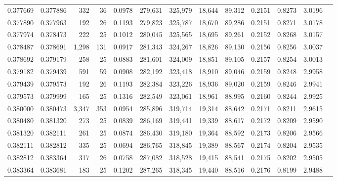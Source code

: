 \begin{tabular}{rrrrrrrrrrrrr}
0.377669 & 0.377886 &   332 &  36 &                                     0.0978 & 279,631 & 325,979 &  18,644 &  89,312 & 0.2151 & 0.8273 & 3.0196 \\
0.377890 & 0.377963 &   192 &  26 &                                     0.1193 & 279,823 & 325,787 &  18,670 &  89,286 & 0.2151 & 0.8271 & 3.0178 \\
0.377974 & 0.378473 &   222 &  25 &                                     0.1012 & 280,045 & 325,565 &  18,695 &  89,261 & 0.2152 & 0.8268 & 3.0157 \\
0.378487 & 0.378691 & 1,298 & 131 &                                     0.0917 & 281,343 & 324,267 &  18,826 &  89,130 & 0.2156 & 0.8256 & 3.0037 \\
0.378692 & 0.379179 &   258 &  25 &                                     0.0883 & 281,601 & 324,009 &  18,851 &  89,105 & 0.2157 & 0.8254 & 3.0013 \\
0.379182 & 0.379439 &   591 &  59 &                                     0.0908 & 282,192 & 323,418 &  18,910 &  89,046 & 0.2159 & 0.8248 & 2.9958 \\
0.379439 & 0.379573 &   192 &  26 &                                     0.1193 & 282,384 & 323,226 &  18,936 &  89,020 & 0.2159 & 0.8246 & 2.9941 \\
0.379573 & 0.379999 &   165 &  25 &                                     0.1316 & 282,549 & 323,061 &  18,961 &  88,995 & 0.2160 & 0.8244 & 2.9925 \\
0.380000 & 0.380473 & 3,347 & 353 &                                     0.0954 & 285,896 & 319,714 &  19,314 &  88,642 & 0.2171 & 0.8211 & 2.9615 \\
0.380480 & 0.381320 &   273 &  25 &                                     0.0839 & 286,169 & 319,441 &  19,339 &  88,617 & 0.2172 & 0.8209 & 2.9590 \\
0.381320 & 0.382111 &   261 &  25 &                                     0.0874 & 286,430 & 319,180 &  19,364 &  88,592 & 0.2173 & 0.8206 & 2.9566 \\
0.382111 & 0.382812 &   335 &  25 &                                     0.0694 & 286,765 & 318,845 &  19,389 &  88,567 & 0.2174 & 0.8204 & 2.9535 \\
0.382812 & 0.383364 &   317 &  26 &                                     0.0758 & 287,082 & 318,528 &  19,415 &  88,541 & 0.2175 & 0.8202 & 2.9505 \\
0.383364 & 0.383681 &   183 &  25 &                                     0.1202 & 287,265 & 318,345 &  19,440 &  88,516 & 0.2176 & 0.8199 & 2.9488 \\

\end{tabular}
